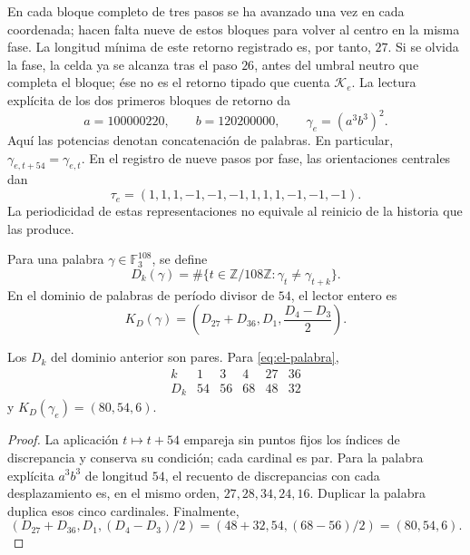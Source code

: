 En cada bloque completo de tres pasos se ha avanzado una vez en cada
coordenada; hacen falta nueve de estos bloques para volver al centro en
la misma fase. La longitud mínima de este retorno registrado es, por
tanto, \(27\). Si se olvida la fase, la celda ya se alcanza tras el
paso \(26\), antes del umbral neutro que completa el bloque; ése no es
el retorno tipado que cuenta \(\mathcal K_e\). La lectura explícita
de los dos primeros bloques de retorno da
\begin{equation}
 a=100000220,\qquad b=120200000,\qquad
 \gamma_e=(a^3b^3)^2.
 \label{eq:el-palabra}
\end{equation}
Aquí las potencias denotan concatenación de palabras. En particular,
\(\gamma_{e,t+54}=\gamma_{e,t}\). En el registro de nueve pasos por
fase, las orientaciones centrales dan
\begin{equation}
 \tau_e=(1,1,1,-1,-1,-1,1,1,1,-1,-1,-1).
 \label{eq:el-tau}
\end{equation}
La periodicidad de estas representaciones no equivale al reinicio de la
historia que las produce.

\begin{definition}
Para una palabra \(\gamma\in\mathbb F_3^{108}\), se define
\[
 D_k(\gamma)=\#\{t\in\mathbb Z/108\mathbb Z:
                   \gamma_t\ne\gamma_{t+k}\}.
\]
En el dominio de palabras de período divisor de \(54\), el lector
entero es
\begin{equation}
 K_D(\gamma)=\left(D_{27}+D_{36},D_1,\frac{D_4-D_3}{2}\right).
 \label{eq:el-kd}
\end{equation}
\end{definition}

\begin{lemma}
Los \(D_k\) del dominio anterior son pares. Para
\eqref{eq:el-palabra},
\[
 \begin{array}{c|rrrrr}
 k&1&3&4&27&36\\\hline
 D_k&54&56&68&48&32
 \end{array}
\]
y \(K_D(\gamma_e)=(80,54,6)\).
\end{lemma}
\begin{proof}
La aplicación \(t\mapsto t+54\) empareja sin puntos fijos los índices
de discrepancia y conserva su condición; cada cardinal es par. Para la
palabra explícita \(a^3b^3\) de longitud \(54\), el recuento de
discrepancias con cada desplazamiento es, en el mismo orden,
\(27,28,34,24,16\). Duplicar la palabra duplica esos cinco cardinales.
Finalmente,
\[
 (D_{27}+D_{36},D_1,(D_4-D_3)/2)
 =(48+32,54,(68-56)/2)=(80,54,6).
\]
\end{proof}

